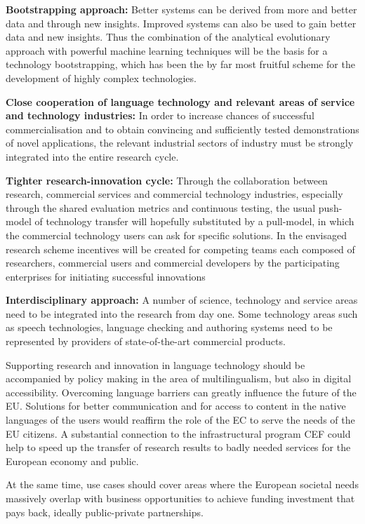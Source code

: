 \documentclass[10pt, plain]{../../metanetpaper}
\begin{document}
\begin{multicols}{2}
\textbf{Bootstrapping approach:} Better systems can be derived from more and better data and through new insights. Improved systems can also be used to gain better data and new insights. Thus the combination of the analytical evolutionary approach with powerful machine learning techniques will be the basis for a technology bootstrapping, which has been the by far most fruitful scheme for the development of highly complex technologies.

\textbf{Close cooperation of language technology and relevant areas of service and technology industries:} In order to increase chances of successful commercialisation and to obtain convincing and sufficiently tested demonstrations of novel applications, the relevant industrial sectors of industry must be strongly integrated into the entire research cycle.

\textbf{Tighter research-innovation cycle:} Through the collaboration between research, commercial services and commercial technology industries, especially through the shared evaluation metrics and continuous testing, the usual push-model of technology transfer will hopefully substituted by a pull-model, in which the commercial technology users can ask for specific solutions. In the envisaged research scheme incentives will be created for competing teams each composed of researchers, commercial users and commercial developers by the participating enterprises for initiating successful innovations

\textbf{Interdisciplinary approach:} A number of science, technology and service areas need to be integrated into the research from day one. Some technology areas such as speech technologies, language checking and authoring systems need to be represented by providers of state-of-the-art commercial products.

Supporting research and innovation in language technology should be accompanied by policy making in the area of multilingualism, but also in digital accessibility. Overcoming language barriers can greatly influence the future of the EU. Solutions for better communication and for access to content in the native languages of the users would reaffirm the role of the EC to serve the needs of the EU citizens. A substantial connection to the infrastructural program CEF could help to speed up the transfer of research results to badly needed services for the European economy and public.
 
At the same time, use cases should cover areas where the European societal needs massively overlap with business opportunities to achieve funding investment that pays back, ideally public-private partnerships.
 

\end{multicols}
\end{document}
